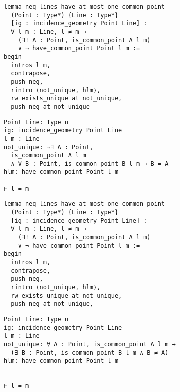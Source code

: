 \begin{frame}[fragile]
	\begin{multicols}{2}
		\begin{lstlisting}
lemma neq_lines_have_at_most_one_common_point 
  (Point : Type*) {Line : Type*} 
  [ig : incidence_geometry Point Line] :
  ∀ l m : Line, l ≠ m → 
    (∃! A : Point, is_common_point A l m) 
    ∨ ¬ have_common_point Point l m := 
begin
  intros l m,
  contrapose,
  push_neg,
  rintro ⟨not_unique, hlm⟩,
  rw exists_unique at not_unique,
  push_neg at not_unique
\end{lstlisting}
		\columnbreak
		\begin{lstlisting}
Point Line: Type u
ig: incidence_geometry Point Line
l m : Line
not_unique: ¬∃ A : Point, 
  is_common_point A l m 
  ∧ ∀ B : Point, is_common_point B l m → B = A
hlm: have_common_point Point l m

⊢ l = m
		\end{lstlisting}
	\end{multicols}
\end{frame}










\begin{frame}[fragile]
	\begin{multicols}{2}
		\begin{lstlisting}
lemma neq_lines_have_at_most_one_common_point 
  (Point : Type*) {Line : Type*} 
  [ig : incidence_geometry Point Line] :
  ∀ l m : Line, l ≠ m → 
    (∃! A : Point, is_common_point A l m) 
    ∨ ¬ have_common_point Point l m := 
begin
  intros l m,
  contrapose,
  push_neg,
  rintro ⟨not_unique, hlm⟩,
  rw exists_unique at not_unique,
  push_neg at not_unique,
\end{lstlisting}
		\columnbreak
		\begin{lstlisting}
Point Line: Type u
ig: incidence_geometry Point Line
l m : Line
not_unique: ∀ A : Point, is_common_point A l m → 
  (∃ B : Point, is_common_point B l m ∧ B ≠ A)
hlm: have_common_point Point l m


⊢ l = m
		\end{lstlisting}
	\end{multicols}
\end{frame}










